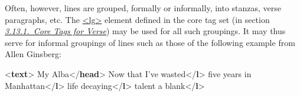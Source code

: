 Often, however, lines are grouped, formally or informally, into stanzas, verse paragraphs, etc. The \hyperref[TEI.lg]{<lg>} element defined in the core tag set (in section \textit{\hyperref[COVE]{3.13.1.\ Core Tags for Verse}}) may be used for all such groupings. It may thus serve for informal groupings of lines such as those of the following example from Allen Ginsberg: \par\bgroup{}\exampleFont \begin{shaded}\noindent\mbox{}{<\textbf{text}>}\mbox{}\newline 
{}\mbox{}\newline 
\hspace*{1em}My Alba{</\textbf{head}>}\mbox{}\newline 
\hspace*{1em}\mbox{}\newline 
\hspace*{1em}\hspace*{1em}Now that I've wasted{</\textbf{l}>}\mbox{}\newline 
\hspace*{1em}\hspace*{1em}five years in Manhattan{</\textbf{l}>}\mbox{}\newline 
\hspace*{1em}\hspace*{1em}life decaying{</\textbf{l}>}\mbox{}\newline 
\hspace*{1em}\hspace*{1em}talent a blank{</\textbf{l}>}\mbox{}\newline 
\hspace*{1em}\mbox{}\newline 

\end{shaded}
